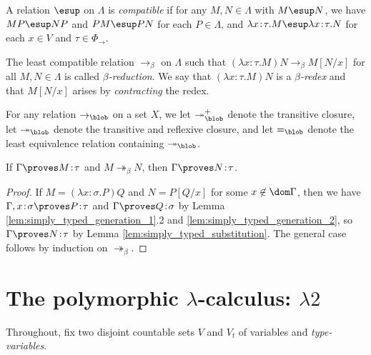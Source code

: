 \documentclass[reqno]{amsart}
\begin{document}
    \begin{definition}
        A relation $\esup$ on $\Lambda$ is \textit{compatible} if for any $M,N\in\Lambda$ with $M\esup N$, we have $MP\esup NP$ and $PM\esup PN$ for each $P\in\Lambda$, and $\lambda x\!:\!\tau.M\esup\lambda x\!:\!\tau.N$ for each $x\in V$ and $\tau\in\Phi_\rightarrow$.
    \end{definition}

    \begin{definition}
        The least compatible relation $\rightarrow_\beta$ on $\Lambda$ such that $(\lambda x\!:\!\tau.M)N\rightarrow_\beta M[N/x]$ for all $M,N\in\Lambda$ is called \textit{$\beta$-reduction}. We say that $(\lambda x\!:\!\tau.M)N$ is a \textit{$\beta$-redex} and that $M[N/x]$ arises by \textit{contracting} the redex.
    \end{definition}

    \begin{notation}
        For any relation $\rightarrow_\blob$ on a set $X$, we let $\twoheadrightarrow_\blob^+$ denote the transitive closure, let $\twoheadrightarrow_\blob$ denote the transitive and reflexive closure, and let $=_\blob$ denote the least equivalence relation containing $\twoheadrightarrow_\blob$.
    \end{notation}

    \begin{theorem}\label{thm:simply_typed_subject_reduction}
        If $\Gamma\proves M\!:\!\tau$ and $M\twoheadrightarrow_\beta N$, then $\Gamma\proves N\!:\!\tau$.
    \end{theorem}
    \begin{proof}
        If $M=(\lambda x\!:\!\sigma.P)Q$ and $N=P[Q/x]$ for some $x\not\in\dom\Gamma$, then we have $\Gamma,x\!:\!\sigma\proves P\!:\!\tau$ and $\Gamma\proves Q\!:\!\sigma$ by Lemma \ref{lem:simply_typed_generation_1}.2 and \ref{lem:simply_typed_generation_2}, so $\Gamma\proves N\!:\!\tau$ by Lemma \ref{lem:simply_typed_substitution}. The general case follows by induction on $\twoheadrightarrow_\beta$.
    \end{proof}

    \section{The polymorphic $\lambda$-calculus: $\lambda2$}

    Throughout, fix two disjoint countable sets $V$ and $V_t$ of variables and \textit{type-variables}.
\end{document}
